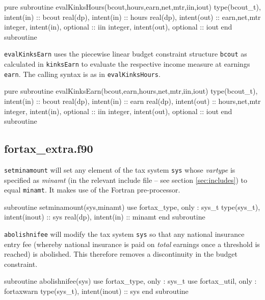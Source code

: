 \documentclass[11pt,thmsa,letter,ukenglish]{article}
\begin{document}
\begin{fortrancode}
pure subroutine evalKinksHours(bcout,hours,earn,net,mtr,iin,iout)
    type(bcout_t),  intent(in)  :: bcout
    real(dp),       intent(in)  :: hours
    real(dp),       intent(out) :: earn,net,mtr
    integer,        intent(in),  optional :: iin
    integer,        intent(out), optional :: iout
end subroutine    
\end{fortrancode}

\noindent\texttt{evalKinksEarn} uses the piecewise linear budget constraint structure \texttt{bcout} as calculated in \texttt{kinksEarn} to evaluate the respective income measure at earnings \texttt{earn}. The calling syntax is as in \texttt{evalKinksHours}.

\begin{fortrancode}
pure subroutine evalKinksEarn(bcout,earn,hours,net,mtr,iin,iout)
    type(bcout_t),  intent(in)  :: bcout
    real(dp),       intent(in)  :: earn
    real(dp),       intent(out) :: hours,net,mtr
    integer,        intent(in),  optional :: iin
    integer,        intent(out), optional :: iout
end subroutine    
\end{fortrancode}

\subsection{fortax\_extra.f90}\label{sec:fortaxextra}

\texttt{setminamount} will set any element of the tax system \texttt{sys} whose \emph{vartype} is specified as \emph{minamt} (in the relevant include file -- see section \ref{sec:includes}) to equal \texttt{minamt}. It makes use of the Fortran pre-processor.

\begin{fortrancode}
subroutine setminamount(sys,minamt)
    use fortax_type, only : sys_t
    type(sys_t), intent(inout) :: sys
    real(dp),    intent(in)    :: minamt
end subroutine
\end{fortrancode}

\noindent\texttt{abolishnifee} will modify the tax system \texttt{sys} so that any national insurance entry fee (whereby national insurance is paid on \emph{total} earnings once a threshold is reached) is abolished. This therefore removes a discontinuity in the budget constraint.
    
\begin{fortrancode}    
subroutine abolishnifee(sys)
    use fortax_type, only : sys_t
    use fortax_util, only : fortaxwarn
    type(sys_t), intent(inout) :: sys
end subroutine
\end{fortrancode}
\end{document}
